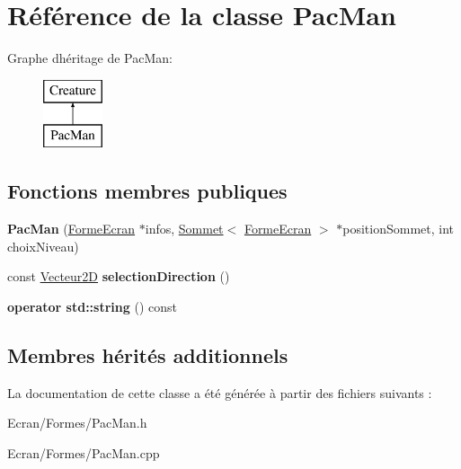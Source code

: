 \hypertarget{class_pac_man}{}\section{Référence de la classe Pac\+Man}
\label{class_pac_man}
Graphe d\textquotesingle{}héritage de Pac\+Man\+:\begin{figure}[H]
\begin{center}
\leavevmode
\includegraphics[height=2.000000cm]{class_pac_man}
\end{center}
\end{figure}
\subsection*{Fonctions membres publiques}
\begin{DoxyCompactItemize}
\item 
\mbox{\label{class_pac_man_a963327bd14cf778af179e22d4f857b56}} 
{\bfseries Pac\+Man} (\mbox{\hyperlink{class_forme_ecran}{Forme\+Ecran}} $\ast$infos, \mbox{\hyperlink{class_sommet}{Sommet}}$<$ \mbox{\hyperlink{class_forme_ecran}{Forme\+Ecran}} $>$ $\ast$position\+Sommet, int choix\+Niveau)
\item 
\mbox{\label{class_pac_man_aacec2666d31b0483108a1da34a052ff4}} 
const \mbox{\hyperlink{class_vecteur2_d}{Vecteur2D}} {\bfseries selection\+Direction} ()
\item 
\mbox{\label{class_pac_man_a4dc17d2e7d32205d02e2d9ef0b18ca39}} 
{\bfseries operator std\+::string} () const
\end{DoxyCompactItemize}
\subsection*{Membres hérités additionnels}


La documentation de cette classe a été générée à partir des fichiers suivants \+:\begin{DoxyCompactItemize}
\item 
Ecran/\+Formes/Pac\+Man.\+h\item 
Ecran/\+Formes/Pac\+Man.\+cpp\end{DoxyCompactItemize}

